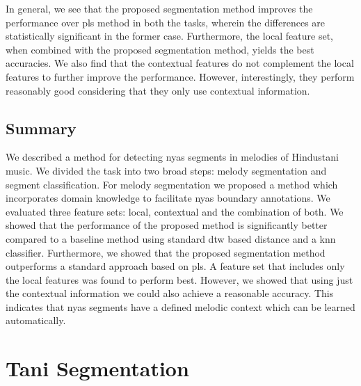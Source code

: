 {In general, we see that the proposed segmentation method improves the performance over \gls{pls} method in both the tasks, wherein the differences are statistically significant in the former case. Furthermore, the local feature set, when combined with the proposed segmentation method, yields the best accuracies. We also find that the contextual features do not complement the local features to further improve the performance. However, interestingly, they perform reasonably good considering that they only use contextual information.


\subsection{Summary}
\label{ConclusionAndFutureWork}

We described a method for detecting \gls{nyas} segments in melodies of Hindustani music. We divided the task into two broad steps: melody segmentation and segment classification. For melody segmentation we proposed a method which incorporates domain knowledge to facilitate \gls{nyas} boundary annotations. We evaluated three feature sets: local, contextual and the combination of both. We showed that the performance of the proposed method is significantly better compared to a baseline method using standard \gls{dtw} based distance and a \gls{knn} classifier. Furthermore, we showed that the proposed segmentation method outperforms a standard approach based on \gls{pls}. A feature set that includes only the local features was found to perform best. However, we showed that using just the contextual information we could also achieve a reasonable accuracy. This indicates that \gls{nyas} segments have a defined melodic context which can be learned automatically. 


\section{Tani Segmentation}
\label{sec:pre_processing_tani_segmentation}

}
